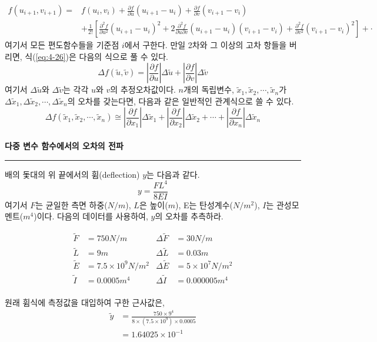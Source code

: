 \begin{equation}
\begin{split}
f(u_{i+1},v_{i+1})=&f(u_i ,v_i)+\frac{\partial f}{\partial u}(u_{i+1}-u_{i})+\frac{\partial f}{\partial v}(v_{i+1}-v_{i})\\
&+\frac{1}{2!}\left[\frac{\partial^2 f}{\partial{u^2}}(u_{i+1}-u_{i})^2+2\frac{\partial^2 f}{\partial u \partial v}(u_{i+1}-u_{i})(v_{i+1}-v_{i})+\frac{\partial^2 f}{\partial v^2}(v_{i+1}-v_{i})^2\right]+\cdot
\end{split}
\label{eq:4-26}
\end{equation}
여기서 모든 편도함수들을 기준점 $i$에서 구한다. 만일 2차와 그 이상의 고차 항들을 버리면, 식(\ref{eq:4-26})은 다음의 식으로 풀 수 있다.
\begin{equation}
\Delta f(\tilde{u},\tilde{v})=\left|\frac{\partial f}{\partial u}\right|\Delta \tilde{u}+\left|\frac{\partial f}{\partial v}\right|\Delta \tilde{v}
\end{equation}
여기서 $\Delta\tilde{u}$와 $\Delta\tilde{v}$는 각각 $u$와 $v$의 추정오차값이다.
$n$개의 독립변수, $\tilde{x}_{1},\tilde{x}_{2},\cdots,\tilde{x}_{n}$가 $\Delta\tilde{x}_{1},\Delta\tilde{x}_{2},\cdots,\Delta\tilde{x}_{n}$의 오차를 갖는다면, 다음과 같은 일반적인 관계식으로 쓸 수 있다.
\begin{equation}
\Delta f(\tilde{x}_{1},\tilde{x}_{2},\cdots,\tilde{x}_{n})\cong \left|\frac{\partial f}{\partial x_{1}}\right| \Delta\tilde{x}_{1}+\left|\frac{\partial f}{\partial x_{2}}\right| \Delta\tilde{x}_{2}+\cdots+\left|\frac{\partial f}{\partial x_{n}}\right| \Delta\tilde{x}_{n}
\label{eq:4-27}
\end{equation}
\\
 \textbf{다중 변수 함수에서의 오차의 전파}\\
\rule{\textwidth}{0.1pt}
배의 돛대의 위 끝에서의 휨(deflection) $y$는 다음과 같다.
\begin{displaymath}
y=\frac{FL^4}{8EI}
\end{displaymath}
여기서 $F$는 균일한 측면 하중($N/m$), $L$은 높이($m$), E는 탄성계수($N/m^2$), $I$는 관성모멘트($m^4$)이다. 다음의 데이터를 사용하여, $y$의 오차를 추측하라.

\begin{align*}
\tilde{F}&=750N/m &
 \Delta\tilde{F}&=30N/m\\
\tilde{L}&=9m &
 \Delta\tilde{L}&=0.03m \\
\tilde{E}&=7.5\times 10^{9}N/m^2 &
 \Delta\tilde{E}&=5 \times 10^{7}N/m^2\\
\tilde{I}&=0.0005m^4 &
 \Delta\tilde{I}&=0.000005m^4
\end{align*}
\\
원래 휨식에 측정값을 대입하여 구한 근사값은,
\begin{align*}
\tilde{y}&=\frac{750 \times 9^4}{8 \times (7.5\times10^9) \times 0.0005}\\
&=1.64025\times 10^{-1}
\end{align*}

